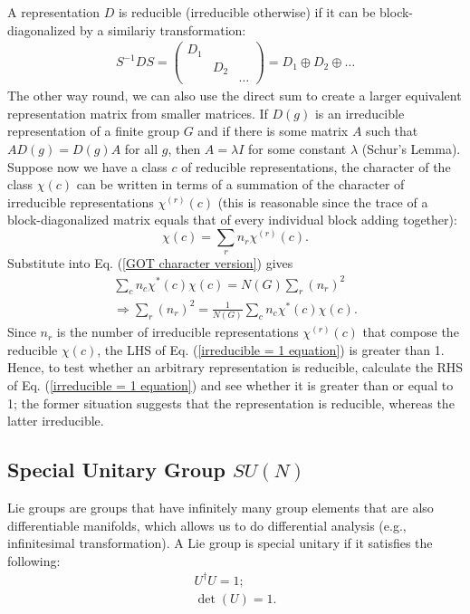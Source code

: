 \documentclass[12pt]{article}
\begin{document}
	A representation $D$ is reducible (irreducible otherwise) if it can be block-diagonalized by a similariy transformation:
	\begin{align}
		S^{-1}DS = \begin{pmatrix}
			D_1 &  & \\
			& D_2 & \\
			&&\dots
		\end{pmatrix} = D_1 \oplus D_2 \oplus \dots 
	\end{align}
	The other way round, we can also use the direct sum to create a larger equivalent representation matrix from smaller matrices. If $D(g)$ is an irreducible representation of a finite group $G$ and if there is some matrix $A$ such that $AD(g) = D(g)A$ for all $g$, then $A = \lambda I$ for some constant $\lambda$ (Schur's Lemma). Suppose now we have a class $c$ of reducible representations, the character of the class $\chi(c)$ can be written in terms of a summation of the character of irreducible representations $\chi^{(r)}(c)$ (this is reasonable since the trace of a block-diagonalized matrix equals that of every individual block adding together):
	\begin{equation}
		\chi(c) = \sum_r n_r\chi^{(r)}(c).
	\end{equation}
	Substitute into Eq. (\ref{GOT character version}) gives
	\begin{align}
		\sum_cn_c\chi^*(c)\chi(c) = N(G)\sum_r(n_r)^2 \\
		\Rightarrow \sum_r(n_r)^2 = \frac{1}{N(G)}\sum_c n_c\chi^*(c)\chi(c). \label{irreducible = 1 equation}
	\end{align}
	Since $n_r$ is the number of irreducible representations $\chi^{(r)}(c)$ that compose the reducible $\chi(c)$, the LHS of Eq. (\ref{irreducible = 1 equation}) is greater than 1. Hence, to test whether an arbitrary representation is reducible, calculate the RHS of Eq. (\ref{irreducible = 1 equation}) and see whether it is greater than or equal to 1; the former situation suggests that the representation is reducible, whereas the latter irreducible. 
	
	
	\subsection{Special Unitary Group $SU(N)$}
	Lie groups are groups that have infinitely many group elements that are also differentiable manifolds, which allows us to do differential analysis (e.g., infinitesimal transformation). A Lie group is special unitary if it satisfies the following:
	\begin{align}
		U^\dagger U = 1 \label{unitary of su n}; \\
		\det(U) = 1 \label{det 1 of su n}.
	\end{align}
	
\end{document}
